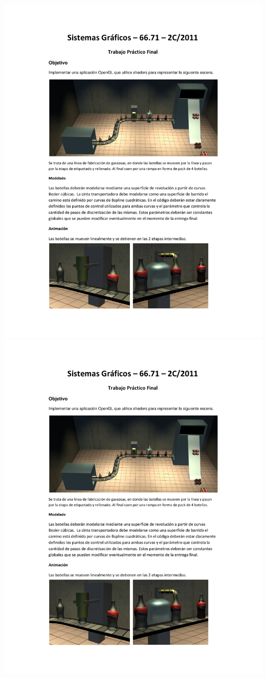 \documentclass[11pt]{article}
\begin{document}
\begin{center}
\includegraphics[trim = 25mm 20mm 10mm 25mm, clip,height=0.95\textheight,width=1.04\textwidth,page={2}]{tpfinal-c2-2011.pdf}
\includegraphics[trim = 25mm 20mm 10mm 25mm, clip,height=0.95\textheight,width=1.04\textwidth,page={3}]{tpfinal-c2-2011.pdf}

\end{center}
\end{document}

